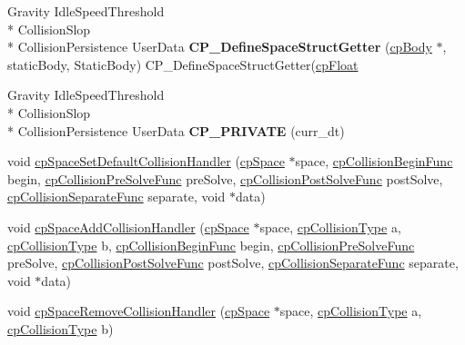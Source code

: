 \begin{DoxyCompactItemize}
\item 
\hypertarget{group__cp_space_ga4f03f8af6df3a85bf7c0cc7ae4aaa54e}{Gravity Idle\-Speed\-Threshold \\*
Collision\-Slop \\*
Collision\-Persistence User\-Data {\bfseries C\-P\-\_\-\-Define\-Space\-Struct\-Getter} (\hyperlink{structcp_body}{cp\-Body} $\ast$, static\-Body, Static\-Body) C\-P\-\_\-\-Define\-Space\-Struct\-Getter(\hyperlink{group__basic_types_gac1ed65573e035bf892505768c852d8d3}{cp\-Float}}\label{group__cp_space_ga4f03f8af6df3a85bf7c0cc7ae4aaa54e}

\item 
\hypertarget{group__cp_space_ga1600f6a20d8b378802701b8933d7a795}{Gravity Idle\-Speed\-Threshold \\*
Collision\-Slop \\*
Collision\-Persistence User\-Data {\bfseries C\-P\-\_\-\-P\-R\-I\-V\-A\-T\-E} (curr\-\_\-dt)}\label{group__cp_space_ga1600f6a20d8b378802701b8933d7a795}

\item 
void \hyperlink{group__cp_space_gada7583f907d492b00b3f7f73398ace7d}{cp\-Space\-Set\-Default\-Collision\-Handler} (\hyperlink{structcp_space}{cp\-Space} $\ast$space, \hyperlink{group__cp_arbiter_ga1abb3a86eb2889bf32349de4c8237612}{cp\-Collision\-Begin\-Func} begin, \hyperlink{group__cp_arbiter_ga00b9651732d9674c945334ed1968d19b}{cp\-Collision\-Pre\-Solve\-Func} pre\-Solve, \hyperlink{group__cp_arbiter_gaf66f0db756c55c5168b4956954af2f12}{cp\-Collision\-Post\-Solve\-Func} post\-Solve, \hyperlink{group__cp_arbiter_ga70549bfa3ae4e806fa1afde420a71775}{cp\-Collision\-Separate\-Func} separate, void $\ast$data)
\item 
void \hyperlink{group__cp_space_ga4ba389406f5a498f5af8044386950d09}{cp\-Space\-Add\-Collision\-Handler} (\hyperlink{structcp_space}{cp\-Space} $\ast$space, \hyperlink{group__basic_types_gae83e2f50965eb441e36ffff1e32e6d02}{cp\-Collision\-Type} a, \hyperlink{group__basic_types_gae83e2f50965eb441e36ffff1e32e6d02}{cp\-Collision\-Type} b, \hyperlink{group__cp_arbiter_ga1abb3a86eb2889bf32349de4c8237612}{cp\-Collision\-Begin\-Func} begin, \hyperlink{group__cp_arbiter_ga00b9651732d9674c945334ed1968d19b}{cp\-Collision\-Pre\-Solve\-Func} pre\-Solve, \hyperlink{group__cp_arbiter_gaf66f0db756c55c5168b4956954af2f12}{cp\-Collision\-Post\-Solve\-Func} post\-Solve, \hyperlink{group__cp_arbiter_ga70549bfa3ae4e806fa1afde420a71775}{cp\-Collision\-Separate\-Func} separate, void $\ast$data)
\item 
\hypertarget{group__cp_space_gaa1483dd8e784ad0c420d60db90aa9a03}{void \hyperlink{group__cp_space_gaa1483dd8e784ad0c420d60db90aa9a03}{cp\-Space\-Remove\-Collision\-Handler} (\hyperlink{structcp_space}{cp\-Space} $\ast$space, \hyperlink{group__basic_types_gae83e2f50965eb441e36ffff1e32e6d02}{cp\-Collision\-Type} a, \hyperlink{group__basic_types_gae83e2f50965eb441e36ffff1e32e6d02}{cp\-Collision\-Type} b)}\label{group__cp_space_gaa1483dd8e784ad0c420d60db90aa9a03}


\end{DoxyCompactItemize}
